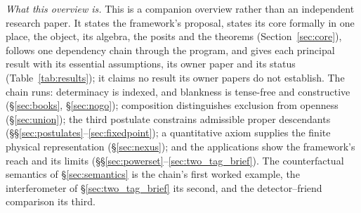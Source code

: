 \documentclass[11pt]{article}
\theoremstyle{definition}
\begin{document}
\textit{What this overview is.} This is a companion overview rather than an independent research paper. It states the framework's proposal, states its core formally in one place, the object, its algebra, the posits and the theorems (Section~\ref{sec:core}), follows one dependency chain through the program, and gives each principal result with its essential assumptions, its owner paper and its status (Table~\ref{tab:results}); it claims no result its owner papers do not establish. The chain runs: determinacy is indexed, and blankness is tense-free and constructive (\S\ref{sec:books}, \S\ref{sec:nogo}); composition distinguishes exclusion from openness (\S\ref{sec:union}); the third postulate constrains admissible proper descendants (\S\S\ref{sec:postulates}--\ref{sec:fixedpoint}); a quantitative axiom supplies the finite physical representation (\S\ref{sec:nexus}); and the applications show the framework's reach and its limits (\S\S\ref{sec:powerset}--\ref{sec:two_tag_brief}). The counterfactual semantics of \S\ref{sec:semantics} is the chain's first worked example, the interferometer of \S\ref{sec:two_tag_brief} its second, and the detector--friend comparison its third.
\end{document}
